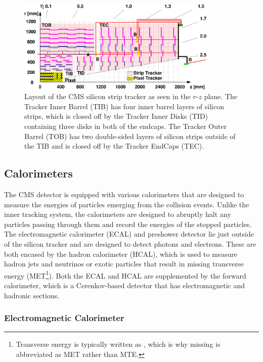 \begin{figure}[htbp] %
  \centering
  \includegraphics[width=0.85\textwidth]{fig/experiment/cms_siliconTracker.pdf}
  \caption{
    Layout of the CMS silicon strip tracker as seen in the $r$-$z$ plane.
    The Tracker Inner Barrel (TIB) has four inner barrel layers of silicon strips, which is closed off by the Tracker Inner Disks (TID) containing three disks in both of the endcaps.
    The Tracker Outer Barrel (TOB) has two double-sided layers of silicon strips outside of the TIB and is closed off by the Tracker EndCaps (TEC).
  }
  \label{fig:CMSsilicon}
\end{figure}

\subsection{Calorimeters}
\label{subsec:calorimeter}

The CMS detector is equipped with various calorimeters that are designed to measure the energies of particles emerging from the collision events.
Unlike the inner tracking system, the calorimeters are designed to abruptly halt any particles passing through them and record the energies of the stopped particles.
The electromagnetic calorimeter (ECAL) and preshower detector lie just outside of the silicon tracker and are designed to detect photons and electrons.
These are both encased by the hadron calorimeter (HCAL), which is used to measure hadron jets and neutrinos or exotic particles that result in missing transverse energy (MET\footnote{Transverse energy is typically written as \Et, which is why missing \Et is abbreviated as MET rather than MTE.}).
Both the ECAL and HCAL are supplemented by the forward calorimeter, which is a Cerenkov-based detector that has electromagnetic and hadronic sections. %

\subsubsection{Electromagnetic Calorimeter}

